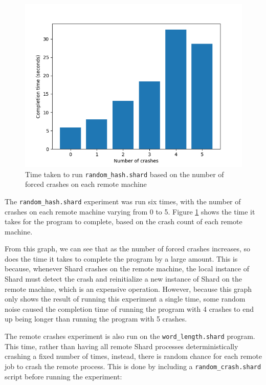 \documentclass[oneside]{report}
\begin{document}
\begin{figure}[h]
  \begin{center}
    \includegraphics[scale=0.9]{img/experiments/e5_1620960581241.png}
    \caption{Time taken to run \texttt{random\_hash.shard} based on the number of forced crashes on each remote machine}
    \label{fig:crashhash}
  \end{center}
\end{figure}

The \texttt{random\_hash.shard} experiment was run six times, with the number of crashes on each remote machine varying from 0 to 5.
Figure \ref{fig:crashhash} shows the time it takes for the program to complete, based on the crash count of each remote machine.

From this graph, we can see that as the number of forced crashes increases, so does the time it takes to complete the program by a large amount.
This is because, whenever Shard crashes on the remote machine, the local instance of Shard must detect the crash and reinitialize a new instance of Shard on the remote machine, which is an expensive operation.
However, because this graph only shows the result of running this experiment a single time, some random noise caused the completion time of running the program with 4 crashes to end up being longer than running the program with 5 crashes.

The remote crashes experiment is also run on the \texttt{word\_length.shard} program.
This time, rather than having all remote Shard processes deterministically crashing a fixed number of times, instead, there is random chance for each remote job to crash the remote process.
This is done by including a \texttt{random\_crash.shard} script before running the experiment:
\end{document}
